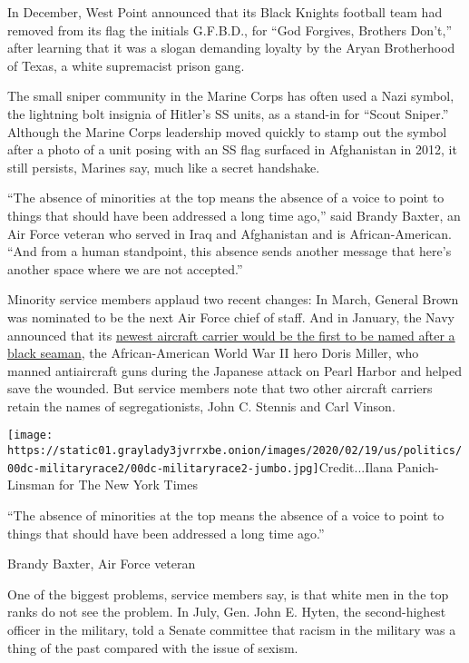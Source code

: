 In December, West Point announced that its Black Knights football team
had removed from its flag the initials G.F.B.D., for ``God Forgives,
Brothers Don't,'' after learning that it was a slogan demanding loyalty
by the Aryan Brotherhood of Texas, a white supremacist prison gang.

The small sniper community in the Marine Corps has often used a Nazi
symbol, the lightning bolt insignia of Hitler's SS units, as a stand-in
for ``Scout Sniper.'' Although the Marine Corps leadership moved quickly
to stamp out the symbol after a photo of a unit posing with an SS flag
surfaced in Afghanistan in 2012, it still persists, Marines say, much
like a secret handshake.

``The absence of minorities at the top means the absence of a voice to
point to things that should have been addressed a long time ago,'' said
Brandy Baxter, an Air Force veteran who served in Iraq and Afghanistan
and is African-American. ``And from a human standpoint, this absence
sends another message that here's another space where we are not
accepted.''

Minority service members applaud two recent changes: In March, General
Brown was nominated to be the next Air Force chief of staff. And in
January, the Navy announced that its
\href{https://www.nytimes3xbfgragh.onion/2020/01/18/us/doris-miller-aircraft-carrier.html}{newest
aircraft carrier would be the first to be named after a black seaman},
the African-American World War II hero Doris Miller, who manned
antiaircraft guns during the Japanese attack on Pearl Harbor and helped
save the wounded. But service members note that two other aircraft
carriers retain the names of segregationists, John C. Stennis and Carl
Vinson.

\texttt{[image: https://static01.graylady3jvrrxbe.onion/images/2020/02/19/us/politics/00dc-militaryrace2/00dc-militaryrace2-jumbo.jpg]}Credit...Ilana
Panich-Linsman for The New York Times

``The absence of minorities at the top means the absence of a voice to
point to things that should have been addressed a long time ago.''

Brandy Baxter, Air Force veteran

One of the biggest problems, service members say, is that white men in
the top ranks do not see the problem. In July, Gen. John E. Hyten, the
second-highest officer in the military, told a Senate committee that
racism in the military was a thing of the past compared with the issue
of sexism.

